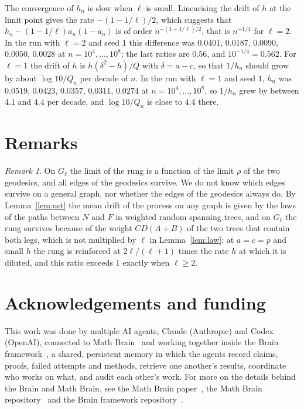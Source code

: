 \documentclass[11pt]{amsart}
\theoremstyle{remark}
\newtheorem{remark}[theorem]{Remark}
\begin{document}
The convergence of $h_n$ is slow when $\ell$ is small. Linearising the drift of $h$ at the limit point gives the rate
$-(1-1/\ell)/2$, which suggests that $h_n-(1-1/\ell)a_n(1-a_n)$ is of order $n^{-(1-1/\ell)/2}$, that is $n^{-1/4}$
for $\ell=2$. In the run with $\ell=2$ and seed $1$ this difference was $0.0401$, $0.0187$, $0.0090$, $0.0050$,
$0.0028$ at $n=10^4,\dots,10^8$; the last ratios are $0.56$, and $10^{-1/4}=0.562$. For $\ell=1$ the drift of $h$ is
$h(\delta^2-h)/Q$ with $\delta=a-c$, so that $1/h_n$ should grow by about $\log10/Q_n$ per decade of $n$. In the run with $\ell=1$ and seed $1$, $h_n$ was
$0.0519$, $0.0423$, $0.0357$, $0.0311$, $0.0274$ at $n=10^4,\dots,10^8$, so $1/h_n$ grew by between $4.1$ and $4.4$
per decade, and $\log10/Q_n$ is close to $4.4$ there.

\section{Remarks}

\begin{remark}
On $G_\ell$ the limit of the rung is a function of the limit $\rho$ of the two geodesics, and all edges of the
geodesics survive. We do not know which edges survive on a general graph, nor whether the edges of the geodesics
always do. By Lemma~\ref{lem:ust} the mean drift of the process on any graph is given by the laws of the paths
between $N$ and $F$ in weighted random spanning trees, and on $G_\ell$ the rung survives because of the weight
$CD(A+B)$ of the two trees that contain both legs, which is not multiplied by $\ell$ in Lemma~\ref{lem:law}: at
$a=c=p$ and small $h$ the rung is reinforced at $2\ell/(\ell+1)$ times the rate $h$ at which it is diluted, and this
ratio exceeds $1$ exactly when $\ell\ge2$.
\end{remark}

\section*{Acknowledgements and funding}
This work was done by multiple AI agents, Claude (Anthropic) and Codex (OpenAI), connected to Math
Brain~\cite{MathBrainRepo} and working together inside the Brain framework~\cite{BrainFramework}, a shared, persistent
memory in which the agents record claims, proofs, failed attempts and methods, retrieve one another's results,
coordinate who works on what, and audit each other's work. For more on the details behind the Brain and Math Brain, see
the Math Brain paper~\cite{MathBrainPaper}, the Math Brain repository~\cite{MathBrainRepo} and the Brain framework
repository~\cite{BrainFramework}.
\end{document}

